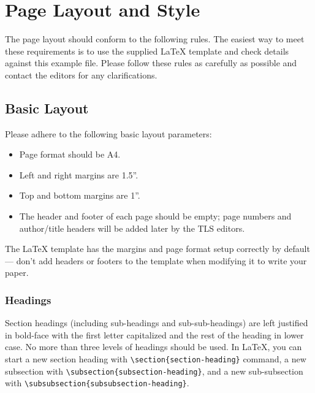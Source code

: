 \documentclass[11pt]{article}
\begin{document}
\section{Page Layout and Style}

The page layout should conform to the following rules. The easiest way to meet these requirements is to use the supplied \LaTeX{} template and check details against this example file. Please follow these rules as carefully as possible and contact the editors for any clarifications.

\subsection{Basic Layout}

Please adhere to the following basic layout parameters:

\begin{itemize}
    \item Page format should be A4.
    \item Left and right margins are 1.5''.
    \item Top and bottom margins are 1''.
    \item The header and footer of each page should be empty; page numbers and author/title headers will be added later by the TLS editors.
\end{itemize}

The \LaTeX{} template has the margins and page format setup correctly by default --- don't add headers or footers to the template when modifying it to write your paper.

\subsubsection{Headings}

Section headings (including sub-headings and sub-sub-headings) are left justified in bold-face with the first letter capitalized and the rest of the heading in lower case. No more than three levels of headings should be used. In \LaTeX{}, you can start a new section heading with \verb|\section{section-heading}| command, a new subsection with \verb|\subsection{subsection-heading}|, and a new sub-subsection with \verb|\subsubsection{subsubsection-heading}|.
\end{document}
